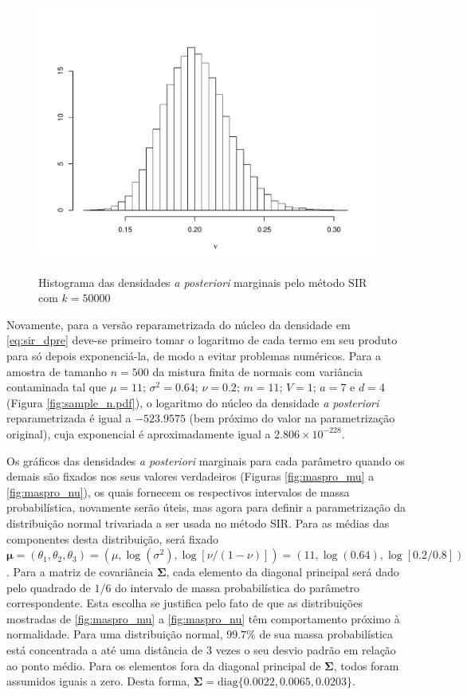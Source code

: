 \begin{figure}[t]
{{			\includegraphics[scale=0.4]{figuras/nu_sir_50000.pdf}}}%
	\caption{Histograma das densidades \textit{a posteriori} marginais pelo método SIR com $k = 50000$}%
\end{figure}

Novamente, para a versão reparametrizada do núcleo da densidade em \eqref{eq:sir_dpre} deve-se primeiro tomar o logaritmo de cada termo em seu produto para só depois exponenciá-la, de modo a evitar problemas numéricos. Para a amostra de tamanho $n=500$ da mistura finita de normais com variância contaminada tal que $\mu = 11$; $\sigma^2 = 0.64$; $\nu = 0.2$; $m = 11$; $V = 1$; $a = 7$ e $d = 4$ (Figura \ref{fig:sample_n.pdf}), o logaritmo do núcleo da densidade \textit{a posteriori} reparametrizada é igual a $-523.9575$ (bem próximo do valor na parametrização original), cuja exponencial é aproximadamente igual a $2.806 \times 10^{-228}$.

Os gráficos das densidades \textit{a posteriori} marginais para cada parâmetro quando os demais são fixados nos seus valores verdadeiros (Figuras \ref{fig:maspro_mu} a \ref{fig:maspro_nu}), os quais fornecem os respectivos intervalos de massa probabilística, novamente serão úteis, mas agora para definir a parametrização da distribuição normal trivariada a ser usada no método SIR. Para as médias das componentes desta distribuição, será fixado $\bm{\mu} = (\theta_1, \theta_2, \theta_3) = (\mu, \log(\sigma^2), \log[\nu/(1-\nu)]) = (11, \log(0.64), \log[0.2/0.8])$. Para a matriz de covariância $\bm{\Sigma}$, cada elemento da diagonal principal será dado pelo quadrado de $1/6$ do intervalo de massa probabilística do parâmetro correspondente. Esta escolha se justifica pelo fato de que as distribuições mostradas de \ref{fig:maspro_mu} a \ref{fig:maspro_nu} têm comportamento próximo à normalidade. Para uma distribuição normal, $99.7\%$ de sua massa probabilística está concentrada a até uma distância de 3 vezes o seu desvio padrão em relação ao ponto médio. Para os elementos fora da diagonal principal de $\bm{\Sigma}$, todos foram assumidos iguais a zero. Desta forma, $\bm{\Sigma} = \textrm{diag}\{0.0022, 0.0065, 0.0203\}$.

